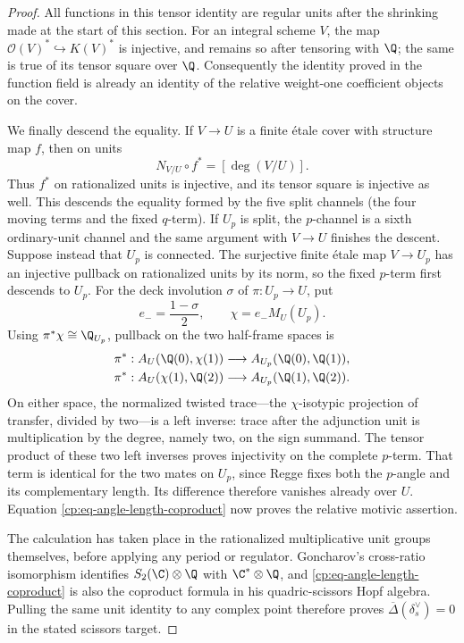 \begin{proof}
All functions in this tensor identity are regular units after the shrinking
made at the start of this section.  For an integral scheme \(V\), the map
\(\mathcal O(V)^*\hookrightarrow K(V)^*\) is injective, and remains so after
tensoring with \(\Q\); the same is true of its tensor square over \(\Q\).
Consequently the identity proved in the function field is already an
identity of the relative weight-one coefficient objects on the cover.

We finally descend the equality.  If \(V\to U\) is a finite \'{e}tale
cover with structure map \(f\), then on units
\[
 N_{V/U}\circ f^*=[\deg(V/U)].
\]
Thus \(f^*\) on rationalized units is injective, and its tensor square is
injective as well.  This descends the equality formed by the five split
channels (the four moving terms and the fixed \(q\)-term).  If \(U_p\) is
split, the \(p\)-channel is a sixth ordinary-unit channel and the same
argument with \(V\to U\) finishes the descent.  Suppose instead that
\(U_p\) is connected.  The surjective finite \'etale map \(V\to U_p\) has
an injective pullback on rationalized units by its norm, so the fixed
\(p\)-term first descends to \(U_p\).  For the deck involution \(\sigma\) of
\(\pi:U_p\to U\), put
\[
 e_-=\frac{1-\sigma}{2},\qquad
 \chi=e_-M_U(U_p).
\]
Using \(\pi^*\chi\cong\Q_{U_p}\), pullback on the two half-frame spaces is
\begin{align*}
 \pi^*:A_U(\Q(0),\chi(1))
     &\longrightarrow A_{U_p}(\Q(0),\Q(1)),\\
 \pi^*:A_U(\chi(1),\Q(2))
     &\longrightarrow A_{U_p}(\Q(1),\Q(2)).
\end{align*}
On either space, the normalized twisted trace---the \(\chi\)-isotypic
projection of transfer, divided by two---is a left inverse: trace after the
adjunction unit is multiplication by the degree, namely two, on the sign
summand.  The tensor product of these
two left inverses proves injectivity on the complete \(p\)-term.  That term
is identical for the two mates on \(U_p\), since Regge fixes both the
\(p\)-angle and its complementary length.  Its difference therefore
vanishes already over \(U\).  Equation
\eqref{cp:eq-angle-length-coproduct} now proves the relative motivic
assertion.

The calculation has taken place in the rationalized multiplicative unit
groups themselves, before applying any period or regulator.  Goncharov's
cross-ratio isomorphism identifies
\(S_2(\C)\otimes\Q\) with \(\C^*\otimes\Q\), and
\eqref{cp:eq-angle-length-coproduct} is also the coproduct formula in his
quadric-scissors Hopf algebra.  Pulling the same unit identity to any
complex point therefore proves
\(\overline\Delta(\delta_s^\vee)=0\) in the stated scissors target.
\end{proof}

